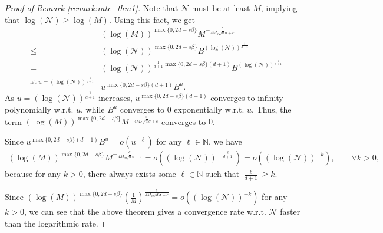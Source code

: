 \documentclass{article}
\def\NN{\mathbb N}
\numberwithin{equation}{section}
\begin{document}
\begin{appendices}
\begin{proof}[Proof of Remark \ref{remark:rate_thm1}]
Note that $\mathcal{N}$ must be at least $M$, implying that $\log(\mathcal{N}) \geq \log (M)$. 
Using this fact, we get
\begin{eqnarray*}
   && (\log (M))^{\max\{0, 2d-s\beta\}} M^{-\frac{c}{4M_d \sqrt{d}\sigma+c}} \\
    &\leq& (\log (\mathcal{N}))^{\max\{0, 2d-s\beta\}}B^{(\log (\mathcal{N}))^{\frac{1}{d+1}}} \\
    &=& (\log (\mathcal{N}))^{\frac{1}{d+1}\max\{0, 2d-s\beta\}(d+1)}B^{(\log (\mathcal{N}))^{\frac{1}{d+1}}}\\
    &\stackrel{\text{let $u= (\log (\mathcal{N}))^{\frac{1}{d+1}}$}}{=}& u ^{\max\{0, 2d-s\beta\}(d+1)}B^u.
\end{eqnarray*}
As $u = (\log (\mathcal{N}))^{\frac{1}{d+1}}$ increases, $u ^{\max\{0, 2d-s\beta\}(d+1)}$ converges to infinity polynomially w.r.t. $u$, while $B^u$ converges to $0$ exponentially w.r.t. $u$. Thus, the term $(\log (M))^{\max\{0, 2d-s\beta\}} M^{-\frac{c}{4M_d \sqrt{d}\sigma+c}}$ converges to $0$.

Since $u ^{\max\{0, 2d-s\beta\}(d+1)}B^u = o (u^{-\ell})$ for any $\ell \in \NN$, we have
\begin{eqnarray*}
    (\log (M))^{\max\{0, 2d-s\beta\}} M^{-\frac{c}{4M_d \sqrt{d}\sigma+c}}= o \left((\log (\mathcal{N}))^{-\frac{\ell}{d+1}}\right) = o\left((\log (\mathcal{N}))^{-k}\right), \qquad \forall k>0,
\end{eqnarray*}
because for any $k>0$, there always exists some $\ell \in \NN$ such that $\frac{\ell}{d+1} \geq k$.

Since  $(\log (M))^{\max\{0, 2d-s\beta\}}\left(\frac{1}{M}\right)^{\frac{c}{4M_d \sqrt{d}\sigma+c}} =  o\left((\log (\mathcal{N}))^{-k}\right)$ for any $k>0$, we can see that the above theorem gives a convergence rate w.r.t. $\mathcal{N}$ faster than the logarithmic rate. 


\end{proof}
\end{appendices}
\end{document}
